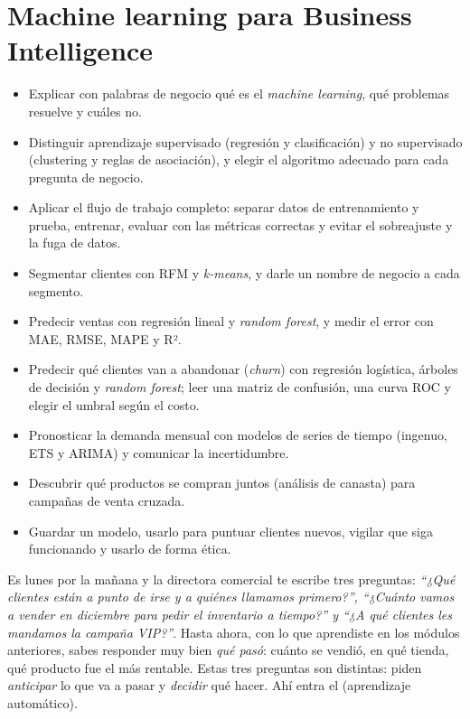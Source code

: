 \chapter{Machine learning para Business Intelligence}
\label{cap:ml}

\begin{objetivos}
\begin{itemize}
  \item Explicar con palabras de negocio qué es el \emph{machine learning}, qué
        problemas resuelve y cuáles no.
  \item Distinguir aprendizaje supervisado (regresión y clasificación) y no
        supervisado (clustering y reglas de asociación), y elegir el algoritmo
        adecuado para cada pregunta de negocio.
  \item Aplicar el flujo de trabajo completo: separar datos de entrenamiento y
        prueba, entrenar, evaluar con las métricas correctas y evitar el
        sobreajuste y la fuga de datos.
  \item Segmentar clientes con RFM y \emph{k-means}, y darle un nombre de
        negocio a cada segmento.
  \item Predecir ventas con regresión lineal y \emph{random forest}, y medir el
        error con MAE, RMSE, MAPE y R².
  \item Predecir qué clientes van a abandonar (\emph{churn}) con regresión
        logística, árboles de decisión y \emph{random forest}; leer una matriz
        de confusión, una curva ROC y elegir el umbral según el costo.
  \item Pronosticar la demanda mensual con modelos de series de tiempo
        (ingenuo, ETS y ARIMA) y comunicar la incertidumbre.
  \item Descubrir qué productos se compran juntos (análisis de canasta) para
        campañas de venta cruzada.
  \item Guardar un modelo, usarlo para puntuar clientes nuevos, vigilar que siga
        funcionando y usarlo de forma ética.
\end{itemize}
\end{objetivos}

Es lunes por la mañana y la directora comercial te escribe tres preguntas:
\emph{``¿Qué clientes están a punto de irse y a quiénes llamamos primero?'',
``¿Cuánto vamos a vender en diciembre para pedir el inventario a tiempo?'' y
``¿A qué clientes les mandamos la campaña VIP?''}. Hasta ahora, con lo que
aprendiste en los módulos anteriores, sabes responder muy bien \emph{qué pasó}:
cuánto se vendió, en qué tienda, qué producto fue el más rentable. Estas tres
preguntas son distintas: piden \emph{anticipar} lo que va a pasar y
\emph{decidir} qué hacer. Ahí entra el  (aprendizaje
automático).

